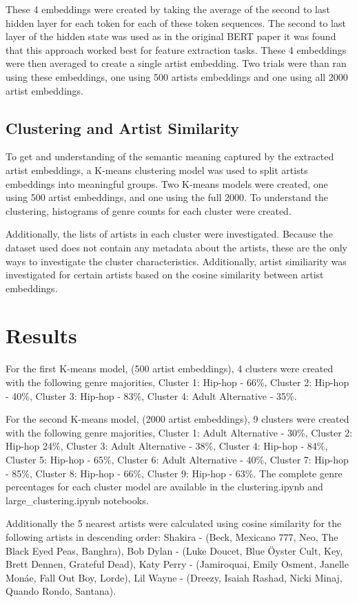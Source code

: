 \documentclass[11pt,a4paper]{article}
\begin{document}
These 4 embeddings were created by taking the average of the second to last hidden layer for each token for each of these token sequences. The second to last layer of the hidden state was used as in the original BERT paper it was found that this approach worked best for feature extraction tasks. These 4 embeddings were then averaged to create a single artist embedding. Two trials were than ran using these embeddings, one using 500 artists embeddings and one using all 2000 artist embeddings.

\subsection{Clustering and Artist Similarity}

To get and understanding of the semantic meaning captured by the extracted artist embeddings, a K-means clustering model was used to split artists embeddings into meaningful groups. Two K-means models were created, one using 500 artist embeddings, and one using the full 2000. To understand the clustering, histograms of genre counts for each cluster were created.

Additionally, the lists of artists in each cluster were investigated. Because the dataset used does not contain any metadata about the artists, these are the only ways to investigate the cluster characteristics. Additionally, artist similiarity was investigated for certain artists based on the cosine similarity between artist embeddings.

\section{Results}
For the first K-means model, (500 artist embeddings), 4 clusters were created with the following genre majorities, Cluster 1: Hip-hop - 66\%, Cluster 2: Hip-hop - 40\%, Cluster 3: Hip-hop - 83\%, Cluster 4: Adult Alternative - 35\%. 

For the second K-means model, (2000 artist embeddings), 9 clusters were created with the following genre majorities, Cluster 1: Adult Alternative - 30\%, Cluster 2: Hip-hop 24\%, Cluster 3: Adult Alternative - 38\%, Cluster 4: Hip-hop - 84\%, Cluster 5: Hip-hop - 65\%, Cluster 6: Adult Alternative - 40\%, Cluster 7: Hip-hop - 85\%, Cluster 8: Hip-hop - 66\%, Cluster 9: Hip-hop - 63\%. The complete genre percentages for each cluster model are available in the clustering.ipynb and large\_clustering.ipynb notebooks.

Additionally the 5 nearest artists were calculated using cosine similarity for the following artists in descending order: Shakira - (Beck, Mexicano 777, Neo, The Black Eyed Peas, Banghra), Bob Dylan - (Luke Doucet, Blue Öyster Cult, Key, Brett Dennen, Grateful Dead), Katy Perry - (Jamiroquai, Emily Osment, Janelle Monáe, Fall Out Boy, Lorde), Lil Wayne - (Dreezy, Isaiah Rashad, Nicki Minaj, Quando Rondo, Santana).
\end{document}
